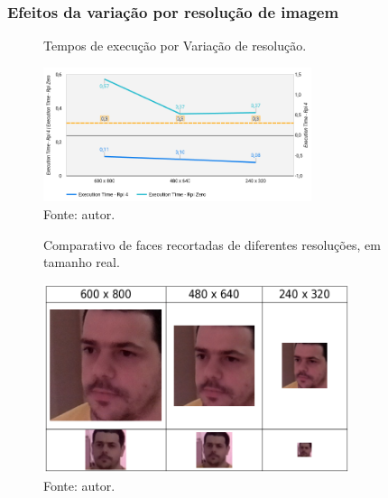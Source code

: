 \subsubsection{Efeitos da variação por resolução de imagem}

\begin{figure}[h]
    \centering
    \caption[Tempos de execução por Variação de resolução.]{Tempos de execução por Variação de resolução.}
    \includegraphics[width=0.7\textwidth]{Cap4_Experimentos_Realizados/Figures/cena2_graficos_variacao_resolucao.jpg}
    \caption*{Fonte: autor.}
    \label{fig:cena2_graficos_variacao_resolucao}
\end{figure}

\begin{figure}[h]
    \centering
    \caption[Comparativo de faces recortadas de diferentes resoluções, em tamanho real.]{Comparativo de faces recortadas de diferentes resoluções, em tamanho real.}
    \includegraphics[width=0.8\textwidth]{Cap4_Experimentos_Realizados/Figures/cena2_comparativo_qualidade_faces_recortadas_tamanho_real.jpg}
    \caption*{Fonte: autor.}
    \label{fig:cena2_comparativo_qualidade_faces_tamanho_real}
\end{figure}

